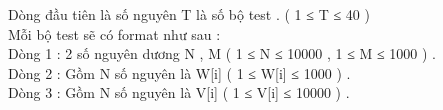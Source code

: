 Dòng đầu tiên là số nguyên T là số bộ test . ( 1 ≤ T ≤ 40 )
\\Mỗi bộ test sẽ có format như sau :
\\Dòng 1 : 2 số nguyên dương N , M ( 1 ≤ N ≤ 10000 , 1 ≤ M ≤ 1000 ) .
\\Dòng 2 : Gồm N số nguyên là W[i] ( 1 ≤ W[i] ≤ 1000 ) .
\\Dòng 3 : Gồm N số nguyên là V[i] ( 1 ≤ V[i] ≤ 10000 ) .

\